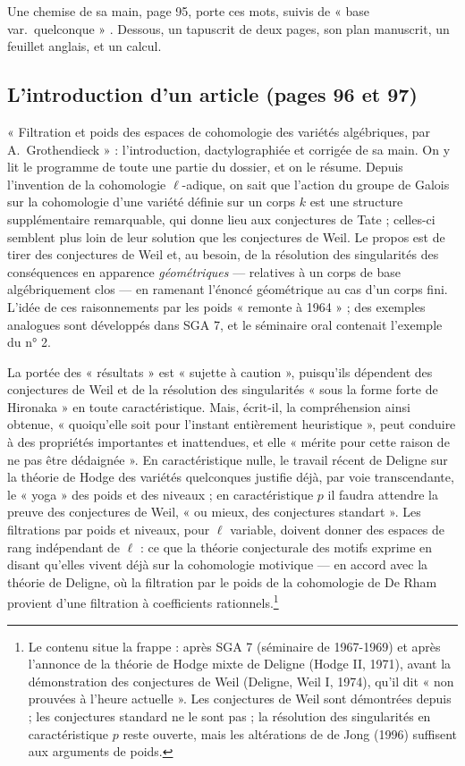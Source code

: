 \documentclass[11pt,a4paper]{article}
\begin{document}
Une chemise de sa main, page 95, porte ces mots, suivis de « base var.\ quelconque »
. Dessous, un tapuscrit de deux pages, son plan manuscrit, un
feuillet anglais, et un calcul.

\subsection*{L'introduction d'un article (pages 96 et 97)}

« Filtration et poids des espaces de cohomologie des variétés algébriques, par
A.\ Grothendieck » : l'introduction, dactylographiée et corrigée de sa main. On y
lit le programme de toute une partie du dossier, et on le résume. Depuis
l'invention de la cohomologie $\ell$-adique, on sait que l'action du groupe de
Galois sur la cohomologie d'une variété définie sur un corps $k$ est une
structure supplémentaire remarquable, qui donne lieu aux conjectures de Tate ;
celles-ci semblent plus loin de leur solution que les conjectures de Weil. Le
propos est de tirer des conjectures de Weil et, au besoin, de la résolution des
singularités des conséquences en apparence \emph{géométriques} --- relatives à un
corps de base algébriquement clos --- en ramenant l'énoncé géométrique au cas
d'un corps fini. L'idée de ces raisonnements par les poids « remonte à 1964 » ;
des exemples analogues sont développés dans SGA 7, et le séminaire oral contenait
l'exemple du n° 2.

La portée des « résultats » est « sujette à caution », puisqu'ils dépendent des
conjectures de Weil et de la résolution des singularités « sous la forme forte de
Hironaka » en toute caractéristique. Mais, écrit-il, la compréhension ainsi
obtenue, « quoiqu'elle soit pour l'instant entièrement heuristique », peut
conduire à des propriétés importantes et inattendues, et elle « mérite pour cette
raison de ne pas être dédaignée ». En caractéristique nulle, le travail récent de
Deligne sur la théorie de Hodge des variétés quelconques justifie déjà, par voie
transcendante, le « yoga » des poids et des niveaux ; en caractéristique $p$ il
faudra attendre la preuve des conjectures de Weil, « ou mieux, des conjectures
standart ». Les filtrations par poids et niveaux, pour $\ell$ variable, doivent
donner des espaces de rang indépendant de $\ell$ : ce que la théorie conjecturale
des motifs exprime en disant qu'elles vivent déjà sur la cohomologie motivique ---
en accord avec la théorie de Deligne, où la filtration par le poids de la
cohomologie de De Rham provient d'une filtration à coefficients
rationnels.\footnote{Le contenu situe la frappe : après SGA 7 (séminaire de
1967-1969) et après l'annonce de la théorie de Hodge mixte de Deligne (Hodge II,
1971), avant la démonstration des conjectures de Weil (Deligne, Weil I, 1974),
qu'il dit « non prouvées à l'heure actuelle ». Les conjectures de Weil sont
démontrées depuis ; les conjectures standard ne le sont pas ; la résolution des
singularités en caractéristique $p$ reste ouverte, mais les altérations de de Jong
(1996) suffisent aux arguments de poids.}
\end{document}
